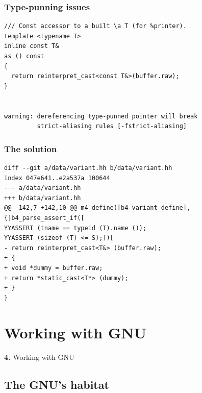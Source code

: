 \documentclass{beamer}
\begin{document}
\begin{frame}[fragile]
  \frametitle{Type-punning issues}
\begin{verbatim}
/// Const accessor to a built \a T (for %printer).
template <typename T>
inline const T&
as () const
{
  return reinterpret_cast<const T&>(buffer.raw);
}


warning: dereferencing type-punned pointer will break
         strict-aliasing rules [-fstrict-aliasing]
\end{verbatim}
\end{frame}

\begin{frame}[fragile]
  \frametitle{The solution}

\begin{verbatim}
diff --git a/data/variant.hh b/data/variant.hh
index 047e641..e2a537a 100644
--- a/data/variant.hh
+++ b/data/variant.hh
@@ -142,7 +142,10 @@ m4_define([b4_variant_define],
{]b4_parse_assert_if([
YYASSERT (tname == typeid (T).name ());
YYASSERT (sizeof (T) <= S);])[
- return reinterpret_cast<T&> (buffer.raw);
+ {
+ void *dummy = buffer.raw;
+ return *static_cast<T*> (dummy);
+ }
}
\end{verbatim}
\end{frame}

\section{Working with GNU}

\begingroup
{}
\begin{frame}
    \begin{center}
        \vspace{1cm}
        {\Huge\color{black} \textbf{4.} { Working with GNU}}
    \end{center}
\end{frame}
\endgroup

\subsection{The GNU's habitat}
\end{document}
